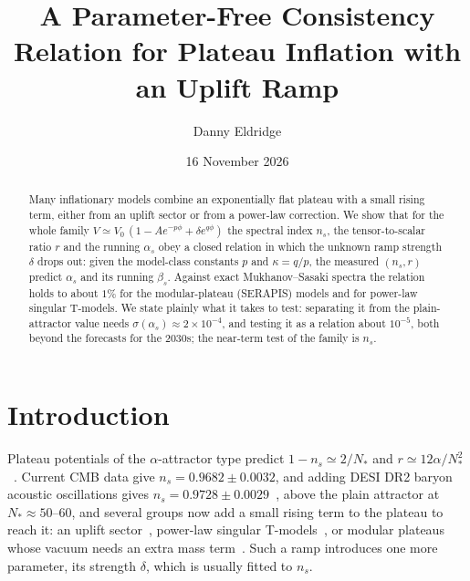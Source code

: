 \documentclass[aps,prd,twocolumn,superscriptaddress,nofootinbib,showkeys]{revtex4-2}
\begin{document}
\title{A Parameter-Free Consistency Relation for Plateau Inflation with an Uplift Ramp}
\author{Danny Eldridge}
\date{16 November 2026}
\begin{abstract}
Many inflationary models combine an exponentially flat plateau with a small rising term, either from an uplift sector or from a power-law correction. We show that for the whole family $V\simeq V_0\,(1-A e^{-p\phi}+\delta e^{q\phi})$ the spectral index $n_s$, the tensor-to-scalar ratio $r$ and the running $\alpha_s$ obey a closed relation in which the unknown ramp strength $\delta$ drops out: given the model-class constants $p$ and $\kappa=q/p$, the measured $(n_s,r)$ predict $\alpha_s$ and its running $\beta_s$. Against exact Mukhanov--Sasaki spectra the relation holds to about $1\%$ for the modular-plateau (SERAPIS) models and for power-law singular T-models. We state plainly what it takes to test: separating it from the plain-attractor value needs $\sigma(\alpha_s)\approx2\times10^{-4}$, and testing it as a relation about $10^{-5}$, both beyond the forecasts for the 2030s; the near-term test of the family is $n_s$.
\end{abstract}
\maketitle

\section{Introduction}
Plateau potentials of the $\alpha$-attractor type predict $1-n_s\simeq2/N_*$ and $r\simeq12\alpha/N_*^2$~\cite{KL2013}. Current CMB data give $n_s=0.9682\pm0.0032$, and adding DESI DR2 baryon acoustic oscillations gives $n_s=0.9728\pm0.0029$~\cite{ACT,SPT,DESI}, above the plain attractor at $N_*\approx50$--$60$, and several groups now add a small rising term to the plateau to reach it: an uplift sector~\cite{KLY2026}, power-law singular T-models~\cite{KL2025}, or modular plateaus whose vacuum needs an extra mass term~\cite{SERAPIS}. Such a ramp introduces one more parameter, its strength $\delta$, which is usually fitted to $n_s$.
\end{document}
